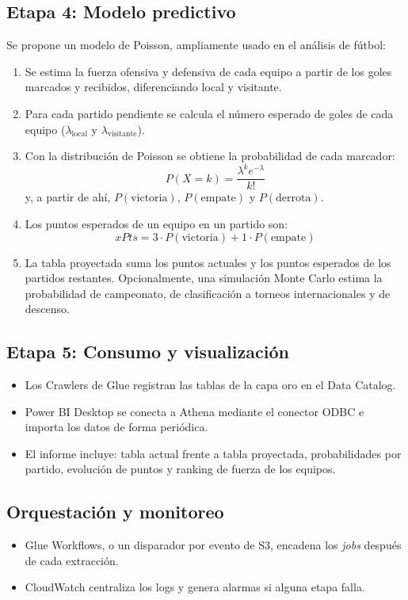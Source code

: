 \documentclass[11pt,a4paper]{article}
\begin{document}
\subsection{Etapa 4: Modelo predictivo}
Se propone un modelo de Poisson, ampliamente usado en el análisis de fútbol:
\begin{enumerate}
  \item Se estima la fuerza ofensiva y defensiva de cada equipo a partir de los goles marcados y recibidos, diferenciando local y visitante.
  \item Para cada partido pendiente se calcula el número esperado de goles de cada equipo ($\lambda_{\text{local}}$ y $\lambda_{\text{visitante}}$).
  \item Con la distribución de Poisson se obtiene la probabilidad de cada marcador:
  \[
    P(X = k) = \frac{\lambda^{k} e^{-\lambda}}{k!}
  \]
  y, a partir de ahí, $P(\text{victoria})$, $P(\text{empate})$ y $P(\text{derrota})$.
  \item Los puntos esperados de un equipo en un partido son:
  \[
    xPts = 3 \cdot P(\text{victoria}) + 1 \cdot P(\text{empate})
  \]
  \item La tabla proyectada suma los puntos actuales y los puntos esperados de los partidos restantes. Opcionalmente, una simulación Monte Carlo estima la probabilidad de campeonato, de clasificación a torneos internacionales y de descenso.
\end{enumerate}

\subsection{Etapa 5: Consumo y visualización}
\begin{itemize}
  \item Los Crawlers de Glue registran las tablas de la capa oro en el Data Catalog.
  \item Power BI Desktop se conecta a Athena mediante el conector ODBC e importa los datos de forma periódica.
  \item El informe incluye: tabla actual frente a tabla proyectada, probabilidades por partido, evolución de puntos y ranking de fuerza de los equipos.
\end{itemize}

\subsection{Orquestación y monitoreo}
\begin{itemize}
  \item Glue Workflows, o un disparador por evento de S3, encadena los \textit{jobs} después de cada extracción.
  \item CloudWatch centraliza los logs y genera alarmas si alguna etapa falla.
\end{itemize}
\end{document}
